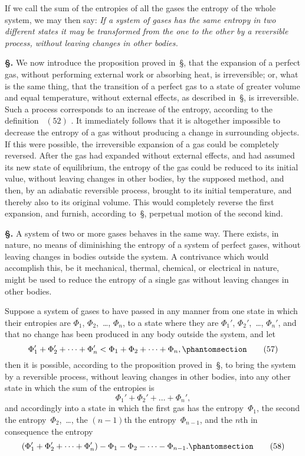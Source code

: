 \documentclass[12pt]{book}[2005/09/16]
\newcommand{\Chg}[2]{#2}
\newcommand{\Add}[1]{\Chg{}{#1}}
\newcommand{\Section}[1]{
  \medskip\par\textbf{§\;#1}
  \label{section:#1}
}
\newcommand{\SecRef}[2][§\;]{\hyperref[section:#2.]{{\upshape #1#2}}}
\newcommand{\Tag}[1]{%
  \phantomsection\label{eqn:#1}\tag*{\ensuremath{#1}}%
}
\newcommand{\Eq}[1]{%
  \hyperref[eqn:#1]{\ensuremath{#1}}%
}
\newcommand{\PageSep}[1]{\ignorespaces}
\begin{document}
If we call the sum of the entropies of all the gases the
entropy of the whole system, we may then say: \emph{If a system
of gases has the same entropy in two different states it may
be transformed from the one to the other by a reversible process,
without leaving changes in other bodies.}

\Section{124.} We now introduce the proposition proved in~\SecRef{118},
that the expansion of a perfect gas, without performing
external work or absorbing heat, is irreversible; or,
what is the same thing, that the transition of a perfect gas
to a state of greater volume and equal temperature, without
external effects, as described in~\SecRef{68}, is irreversible. Such
a process corresponds to an increase of the entropy, according
to the definition~\Eq{(52)}. It immediately follows that it
is altogether impossible to decrease the entropy of a gas
without producing a change in surrounding objects. If this
were possible, the irreversible expansion of a gas could be
completely reversed. After the gas had expanded without
external effects, and had assumed its new state of equilibrium,
the entropy of the gas could be reduced to its initial
value, without leaving changes in other bodies, by the
supposed method, and then, by an adiabatic reversible
process, brought to its initial temperature, and thereby also
to its original volume. This would completely reverse the
\PageSep{93}
first expansion, and furnish, according to~\SecRef{118}, perpetual
motion of the second kind.

\Section{125.} A system of two or more gases behaves in the
same way. There exists, in nature, no means of diminishing
the entropy of a system of perfect gases, without leaving
%
changes in bodies outside the system. A contrivance
which would accomplish this, be it mechanical, thermal,
chemical, or electrical in nature, might be used to reduce
the entropy of a single gas without leaving changes in
other bodies.

Suppose a system of gases to have passed in any manner
from one state in which their entropies are $\Phi_{1}$, $\Phi_{2}$\Add{,}~\dots\Add{,} $\Phi_{n}$,
to a state where they are $\Phi_{1}'$, $\Phi_{2}'$\Add{,}~\dots\Add{,} $\Phi_{n}'$, and that no
change has been produced in any body outside the system,
and let
\[
\Phi_{1}' + \Phi_{2}' + \dots + \Phi_{n}' < \Phi_{1} + \Phi_{2} + \dots + \Phi_{n},
\Tag{(57)}
\]
then it is possible, according to the proposition proved in~\SecRef{123},
to bring the system by a reversible process, without
leaving changes in other bodies, into any other state in
which the sum of the entropies is
\[
\Phi_{1}' + \Phi_{2}' + \dots + \Phi_{n}',
\]
and accordingly into a state in which the first gas has
the entropy~$\Phi_{1}$, the second the entropy~$\Phi_{2}$\Add{,}~\dots, the
$(n - 1)$th the entropy~$\Phi_{n-1}$, and the $n$th in consequence the
entropy
\[
(\Phi_{1}' + \Phi_{2}' + \dots + \Phi_{n}') - \Phi_{1} - \Phi_{2} - \dots - \Phi_{n-1}\Add{.}
\Tag{(58)}
\]
\end{document}
